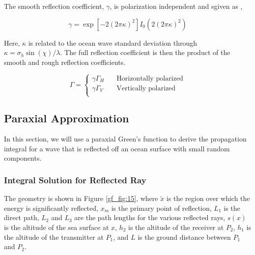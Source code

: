The smooth reflection coefficient, $\gamma$, is polarization independent and sgiven as \cite{miller_reflection}, \cite{lohrmann_rcs}

\begin{equation}
\gamma = \exp\left[-2(2\pi \kappa)^2 \right]I_0\left(2(2\pi \kappa)^2 \right)
\label{gf_mb:4}
\end{equation}
\renewcommand{\baselinestretch}{2} \small\normalsize

Here, $\kappa$ is related to the ocean wave standard deviation through $\kappa = \sigma_h \sin(\chi)/\lambda$. The full reflection coefficient is then the product of the smooth and rough reflection coefficients.

\begin{equation}
\Gamma =
  \begin{cases}
    \gamma\Gamma_H       & \quad \text{Horizontally polarized}\\
    \gamma\Gamma_V & \quad \text{Vertically polarized}\\
  \end{cases}
\label{gf_mb:5}
\end{equation}
\renewcommand{\baselinestretch}{2} \small\normalsize

\subsection{Paraxial Approximation}\label{paraxial_diffraction}
In this section, we will use a paraxial Green's function to derive the propagation integral for a wave that is reflected off an ocean surface with small random components.

\subsubsection{Integral Solution for Reflected Ray}
 The geometry is shown in Figure \ref{gf_fig:15}, where $\tilde{x}$ is the region over which the energy is significantly reflected, $x_m$ is the primary point of reflection, $L_1$ is the direct path, $L_2$ and $L_3$ are the path lengths for the various reflected rays, $s(x)$ is the altitude of the sea surface at $x$, $h_2$ is the altitude of the receiver at $P_2$, $h_1$ is the altitude of the transmitter at $P_1$, and $L$ is the ground distance between $P_1$ and $P_2$. 

